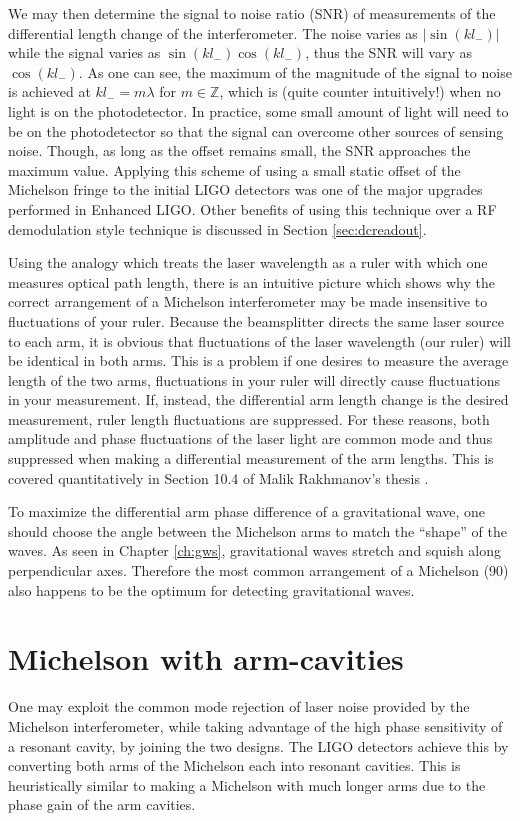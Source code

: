 We may then determine the signal to noise ratio (SNR) of measurements of the differential length change of the interferometer. %
The noise varies as $|\sin(kl_-)|$ while the signal varies as $\sin(kl_-)\cos(kl_-)$, thus the SNR will vary as $\cos(kl_-)$. %
As one can see, the maximum of the magnitude of the signal to noise is achieved at $kl_- = m \lambda$ for $m \in \mathbb{Z}$, which is (quite counter intuitively!) when no light is on the photodetector. %
In practice, some small amount of light will need to be on the photodetector so that the signal can overcome other sources of sensing noise. %
Though, as long as the offset remains small, the SNR approaches the maximum value. %
Applying this scheme of using a small static offset of the Michelson fringe to the initial LIGO detectors was one of the major upgrades performed in Enhanced LIGO. %
Other benefits of using this technique over a RF demodulation style technique is discussed in Section \ref{sec:dcreadout}.

Using the analogy which treats the laser wavelength as a ruler with which one measures optical path length, there is an intuitive picture which shows why the correct arrangement of a Michelson interferometer may be made insensitive to fluctuations of your ruler. %
Because the beamsplitter directs the same laser source to each arm, it is obvious that fluctuations of the laser wavelength (our ruler) will be identical in both arms. %
This is a problem if one desires to measure the average length of the two arms, fluctuations in your ruler will directly cause fluctuations in your measurement. %
If, instead, the differential arm length change is the desired measurement, ruler length fluctuations are suppressed. %
For these reasons, both amplitude and phase fluctuations of the laser light are common mode and thus suppressed when making a differential measurement of the arm lengths. %
This is covered quantitatively in Section 10.4 of Malik Rakhmanov's thesis \cite{Rakhmanov}.

To maximize the differential arm phase difference of a gravitational wave, one should choose the angle between the Michelson arms to match the ``shape'' %
of the waves. %
As seen in Chapter \ref{ch:gws}, gravitational waves stretch and squish along perpendicular axes. %
Therefore the most common arrangement of a Michelson (90\degrees{}) also happens to be the optimum for detecting gravitational waves.

\section{Michelson with arm-cavities}
\label{sec:armcav}
One may exploit the common mode rejection of laser noise provided by the Michelson interferometer, while taking advantage of the high phase sensitivity of a resonant cavity, by joining the two designs. %
The LIGO detectors achieve this by converting both arms of the Michelson each into resonant cavities. %
This is heuristically similar to making a Michelson with much longer arms due to the phase gain of the arm cavities.

